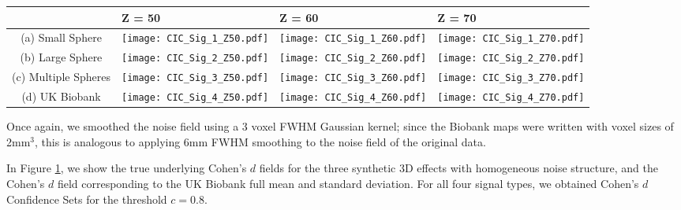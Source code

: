 \begin{table}[htbp]
\hspace*{-0.5cm}
\begin{adjustbox}{center}
\centering
    \begin{tabular}{cm{50mm}m{50mm}m{50mm}}
       \toprule
         & \hspace{14.8mm} Z = 50 & \hspace{14.8mm} Z = 60 & \hspace{14.8mm} Z = 70 \\
        \midrule
        (a) Small Sphere & \texttt{[image: CIC\_Sig\_1\_Z50.pdf]} & \texttt{[image: CIC\_Sig\_1\_Z60.pdf]} & \texttt{[image: CIC\_Sig\_1\_Z70.pdf]} \\
        (b) Large Sphere & \texttt{[image: CIC\_Sig\_2\_Z50.pdf]} & \texttt{[image: CIC\_Sig\_2\_Z60.pdf]} & \texttt{[image: CIC\_Sig\_2\_Z70.pdf]} \\
        (c) Multiple Spheres & \texttt{[image: CIC\_Sig\_3\_Z50.pdf]} & \texttt{[image: CIC\_Sig\_3\_Z60.pdf]} & \texttt{[image: CIC\_Sig\_3\_Z70.pdf]} \\
        (d) UK Biobank & \texttt{[image: CIC\_Sig\_4\_Z50.pdf]} & \texttt{[image: CIC\_Sig\_4\_Z60.pdf]} & \texttt{[image: CIC\_Sig\_4\_Z70.pdf]} \\
        \bottomrule
    \end{tabular}
\end{adjustbox}
    \label{tbl:Cohens_d_3D_figures}
\end{table}

Once again, we smoothed the noise field using a 3 voxel FWHM Gaussian kernel; since the Biobank maps were written with voxel sizes of 2mm$^{3}$, this is analogous to applying 6mm FWHM smoothing to the noise field of the original data. 

In Figure \ref{tbl:Cohens_d_3D_figures}, we show the true underlying Cohen's $d$ fields for the three synthetic 3D effects with homogeneous noise structure, and the Cohen's $d$ field corresponding to the UK Biobank full mean and standard deviation. For all four signal types, we obtained Cohen's $d$ Confidence Sets for the threshold $c = 0.8$. 

